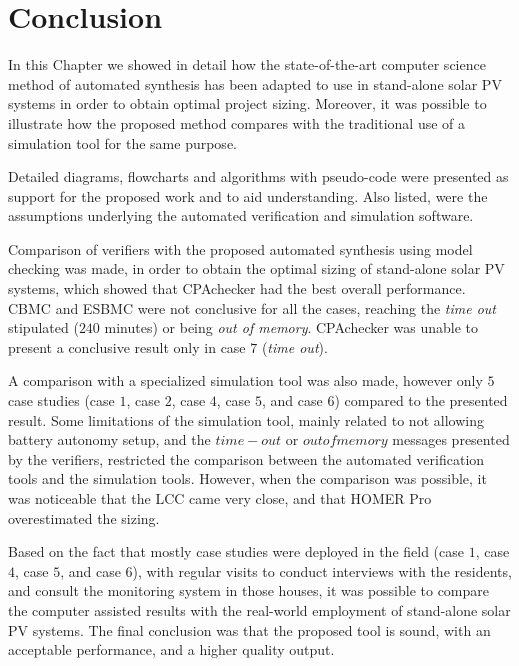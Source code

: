 \section{Conclusion}

In this Chapter we showed in detail how the state-of-the-art computer science method of automated synthesis has been adapted to use in stand-alone solar PV systems in order to obtain optimal project sizing. Moreover, it was possible to illustrate how the proposed method compares with the traditional use of a simulation tool for the same purpose.

Detailed diagrams, flowcharts and algorithms with pseudo-code were presented as support for the proposed work and to aid understanding. Also listed, were the assumptions underlying the automated verification and simulation software. 

Comparison of verifiers with the proposed automated synthesis using model checking was made, in order to obtain the optimal sizing of stand-alone solar PV systems, which showed that CPAchecker had the best overall performance. CBMC and ESBMC were not conclusive for all the cases, reaching the \textit{time out} stipulated ($240$ minutes) or being \textit{out of memory}. CPAchecker was unable to present a conclusive result only in case $7$ (\textit{time out}).

A comparison with a specialized simulation tool was also made, however only $5$ case studies (case $1$, case $2$, case $4$, case $5$, and case $6$) compared to the presented result. Some limitations of the simulation tool, mainly related to not allowing battery autonomy setup, and the $time-out$ or $out of memory$ messages presented by the verifiers, restricted the comparison between the automated verification tools and the simulation tools. However, when the comparison was possible, it was noticeable that the LCC came very close, and that HOMER Pro overestimated the sizing.

Based on the fact that mostly case studies were deployed in the field (case $1$, case $4$, case $5$, and case $6$), with regular visits to conduct interviews with the residents, and consult the monitoring system in those houses, it was possible to compare the computer assisted results with the real-world employment of stand-alone solar PV systems. The final conclusion was that the proposed tool is sound, with an acceptable performance, and a higher quality output.